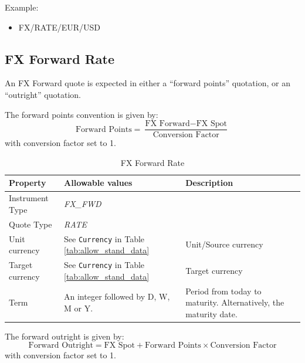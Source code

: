 Example:
\begin{itemize}
\item {FX/RATE/EUR/USD}
\end{itemize}

\subsection{FX Forward Rate}
\label{ss:fx_forward_rate}

An FX Forward quote is expected in either a ``forward points'' quotation, or an ``outright'' quotation.

The forward points convention is given by:
$$
\mbox{Forward Points} = \frac{\mbox{FX Forward} - \mbox{FX
    Spot}}{\mbox{Conversion Factor}}
$$
with conversion factor set to 1.

\begin{table}[H]
\centering
  \begin{tabular}{|p{3.5cm}|p{3.5cm}|p{6.5cm}|}
  \hline
    {\bf Property} & {\bf Allowable values} & {\bf Description}\\ \hline
    Instrument Type & \emph{FX\_FWD} & \\ \hline
    Quote Type & \emph{RATE} & \\ \hline
    Unit currency & See \lstinline!Currency! in Table \ref{tab:allow_stand_data} & Unit/Source currency\\ \hline
    Target currency & See \lstinline!Currency! in Table   \ref{tab:allow_stand_data} & Target currency\\  \hline
    Term & An integer followed by D, W, M or Y. & Period from today to  maturity. Alternatively, the maturity date.\\ \hline
  \end{tabular}
  \caption{FX Forward Rate}
  \label{tab:fxfwd_quote}
\end{table}

The forward outright is given by:
$$
\mbox{Forward Outright} = \mbox{FX Spot} + \mbox{Forward Points}\times{\mbox{Conversion Factor}}
$$
with conversion factor set to 1.

